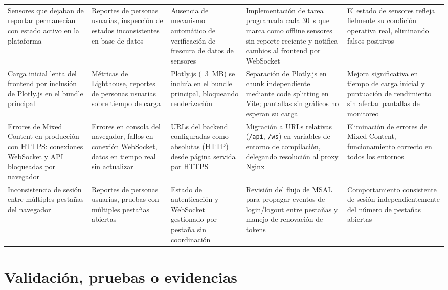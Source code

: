 \begin{longtable}{p{2.7cm} p{2.7cm} p{2.7cm} p{3cm} p{3cm}}
\addlinespace

Sensores que dejaban de reportar permanecían con estado activo en la
plataforma &
Reportes de personas usuarias, inspección de estados inconsistentes en base
de datos &
Ausencia de mecanismo automático de verificación de frescura de datos de
sensores &
Implementación de tarea programada cada 30~s que marca como offline sensores
sin reporte reciente y notifica cambios al frontend por WebSocket &
El estado de sensores refleja fielmente su condición operativa real,
eliminando falsos positivos \\

\addlinespace

Carga inicial lenta del frontend por inclusión de Plotly.js en el bundle
principal &
Métricas de Lighthouse, reportes de personas usuarias sobre tiempo de carga &
Plotly.js (~3~MB) se incluía en el bundle principal, bloqueando renderización &
Separación de Plotly.js en chunk independiente mediante code splitting en
Vite; pantallas sin gráficos no esperan su carga &
Mejora significativa en tiempo de carga inicial y puntuación de rendimiento
sin afectar pantallas de monitoreo \\

\addlinespace

Errores de Mixed Content en producción con HTTPS: conexiones WebSocket y API
bloqueadas por navegador &
Errores en consola del navegador, fallos en conexión WebSocket, datos en
tiempo real sin actualizar &
URLs del backend configuradas como absolutas (HTTP) desde página servida por
HTTPS &
Migración a URLs relativas (\texttt{/api}, \texttt{/ws}) en variables de
entorno de compilación, delegando resolución al proxy Nginx &
Eliminación de errores de Mixed Content, funcionamiento correcto en todos los
entornos \\

\addlinespace

Inconsistencia de sesión entre múltiples pestañas del navegador &
Reportes de personas usuarias, pruebas con múltiples pestañas abiertas &
Estado de autenticación y WebSocket gestionado por pestaña sin coordinación &
Revisión del flujo de MSAL para propagar eventos de login/logout entre
pestañas y manejo de renovación de tokens &
Comportamiento consistente de sesión independientemente del número de
pestañas abiertas \\
\bottomrule
\end{longtable}

\section{Validación, pruebas o evidencias}

